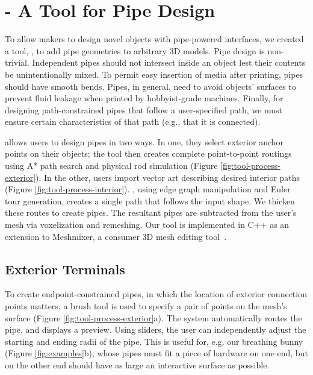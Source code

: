 \section{\systemname - A Tool for Pipe Design}
To allow makers to design novel objects with pipe-powered interfaces, we created a tool, \systemnamenospace, to add pipe geometries to arbitrary 3D models. Pipe design is non-trivial.  Independent pipes should not intersect inside an object lest their contents be unintentionally mixed.  To permit easy insertion of media after printing, pipes should have smooth bends.  Pipes, in general, need to avoid objects' surfaces to prevent fluid leakage when printed by hobbyist-grade machines.  Finally, for designing path-constrained pipes that follow a user-specified path, we must ensure certain characteristics of that path (e.g., that it is connected). 

\systemname allows users to design pipes in two ways. In one, they select exterior anchor points on their objects; the tool then creates complete point-to-point routings using A* path search and physical rod simulation (Figure \ref{fig:tool-process-exterior}). In the other, users import vector art describing desired interior paths (Figure \ref{fig:tool-process-interior}).  \systemname, using edge graph manipulation and Euler tour generation, creates a single path that follows the input shape.  We thicken these routes to create pipes.  The resultant pipes are subtracted from the user's mesh via voxelization and remeshing. Our tool is implemented in C++ as an extension to Meshmixer, a consumer 3D mesh editing tool~\cite{Schmidt-meshmixer}.

\subsection{Exterior Terminals}

To create endpoint-constrained pipes, in which the location of exterior connection points matters, a brush tool is used to specify a pair of points on the mesh's surface (Figure \ref{fig:tool-process-exterior}a). The system automatically routes the pipe, and displays a preview.  Using sliders, the user can independently adjust the starting and ending radii of the pipe.  This is useful for, e.g, our breathing bunny (Figure \ref{fig:examples}b), whose pipes must fit a piece of hardware on one end, but on the other end should have as large an interactive surface as possible.

